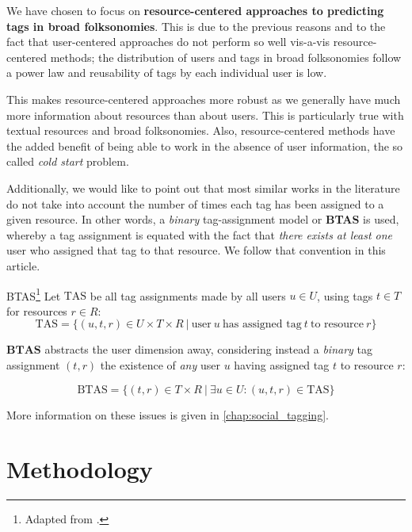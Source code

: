 We have chosen to focus on \textbf{resource-centered approaches to predicting tags in broad folksonomies}. This is due to the previous reasons and to the fact \citep{song_etal_2011} that user-centered approaches do not perform so well vis-a-vis resource-centered methods; the distribution of users and tags in broad folksonomies follow a power law and reusability of tags by each individual user is low. 

This makes resource-centered approaches more robust as we generally have much more information about resources than about users. This is particularly true with textual resources and broad folksonomies. Also, resource-centered methods have the added benefit of being able to work in the absence of user information, the so called \textit{cold start} problem.

Additionally, we would like to point out that most similar works in the literature do not take into account the number of times each tag has been assigned to a given resource. In other words, a \textit{binary} tag-assignment model or \textbf{BTAS} \citep{illig_etal_2011} is used, whereby a tag assignment is equated with the fact that \textit{there exists at least one} user who assigned that tag to that resource. We follow that convention in this article.

\begin{definition}{BTAS}\footnote{Adapted from \cite{illig_etal_2011}.}
Let $\text{TAS}$ be all tag assignments made by all users $u \in U$, using tags $t \in T$ for resources $r \in R$:
\[ \text{TAS} = \{ (u,t,r) \in  U \times T \times R \ | \ \text{user} \ u \ \text{has assigned tag} \ t \ \text{to resource} \ r \} \]  

$\mathbf{BTAS}$ abstracts the user dimension away, considering instead a \textit{binary} tag assignment $(t,r)$ the existence of \textit{any} user $u$ having assigned tag $t$ to resource $r$:

\[ \text{BTAS} = \{(t,r) \in T \times R \ | \ \exists u \in U : (u,t,r) \in \text{TAS} \}  \]

\end{definition}

More information on these issues is given in \autoref{chap:social_tagging}.

\section{Methodology}\label{section:intro_methodology}

